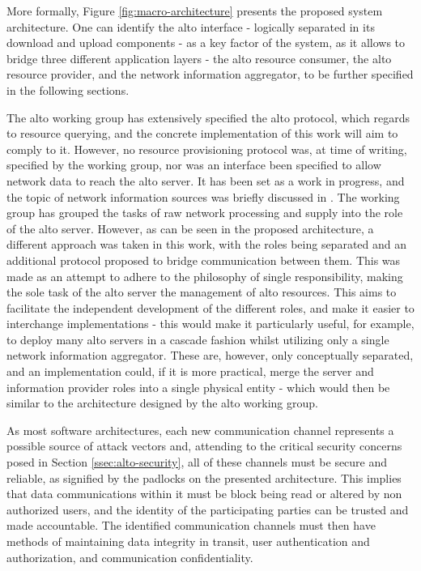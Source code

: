     More formally, Figure \ref{fig:macro-architecture} presents the proposed system architecture.
    One can identify the \gls{alto} interface - logically separated in its download and upload components - as a key factor of the system, as it allows to bridge three different application layers - the \gls{alto} resource consumer, the \gls{alto} resource provider, and the network information aggregator, to be further specified in the following sections.

    The \gls{alto} working group has extensively specified the \gls{alto} protocol, which regards to resource querying, and the concrete implementation of this work will aim to comply to it.
    However, no resource provisioning protocol was, at time of writing, specified by the working group, nor was an interface been specified to allow network data to reach the \gls{alto} server.
    It has been set as a work in progress, and the topic of network information sources was briefly discussed in \cite{alto-deployment-considerations}.
    The working group has grouped the tasks of raw network processing and supply into the role of the \gls{alto} server.
    However, as can be seen in the proposed architecture, a different approach was taken in this work, with the roles being separated and an additional protocol proposed to bridge communication between them.
    This was made as an attempt to adhere to the philosophy of single responsibility, making the sole task of the \gls{alto} server the management of \gls{alto} resources.
    This aims to facilitate the independent development of the different roles, and make it easier to interchange implementations - this would make it particularly useful, for example, to deploy many \gls{alto} servers in a cascade fashion whilst utilizing only a single network information aggregator.
    These are, however, only conceptually separated, and an implementation could, if it is more practical, merge the server and information provider roles into a single physical entity - which would then be similar to the architecture designed by the \gls{alto} working group.

    As most software architectures, each new communication channel represents a possible source of attack vectors and, attending to the critical security concerns posed in Section \ref{ssec:alto-security}, all of these channels must be secure and reliable, as signified by the padlocks on the presented architecture.
    This implies that data communications within it must be block being read or altered by non authorized users, and the identity of the participating parties can be trusted and made accountable.
    The identified communication channels must then have methods of maintaining data integrity in transit, user authentication and authorization, and communication confidentiality.

